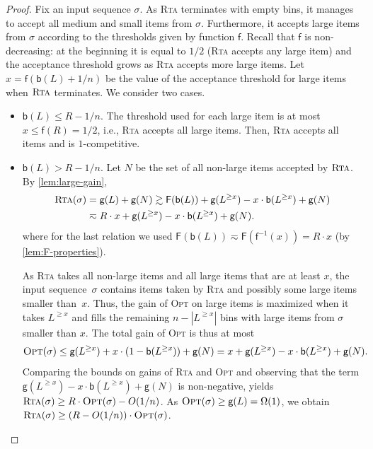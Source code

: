 \documentclass[a4paper,USenglish,cleveref]{lipics-v2019}
\newcommand{\R}{\ensuremath{R}}
\newcommand{\LG}{\ensuremath{L}\xspace}
\newcommand{\f}{\textsf{f}}
\newcommand{\fintegral}{\textsf{F}}
\newcommand{\B}{\textsf{b}}
\newcommand{\gain}{\textsf{g}}
\newcommand{\ALG}{\textsc{Rta}\xspace}
\newcommand{\OPT}{\textsc{Opt}\xspace}
\begin{document}
\begin{proof}
Fix an input sequence $\sigma$. As \ALG terminates with empty bins, it manages to 
accept all medium and small items from $\sigma$. Furthermore, it accepts large 
items from $\sigma$ according to the thresholds given by function $\f$.
Recall that $\f$ is non-decreasing: at the beginning it is equal to
$1/2$ (\ALG accepts any large item) and the acceptance threshold 
grows as \ALG accepts more large items. 
Let $x = \f(\B(\LG)+1/n)$ be the value of the acceptance
threshold for large items when $\ALG$ terminates.
We consider two cases. 

\begin{itemize}
\item $\B(\LG) \leq \R - 1/n$.
The threshold used for each large item is at most $x \leq \f(\R) = 1/2$, i.e.,
\ALG accepts all large items. Then, \ALG accepts all items and is
$1$-competitive.

\item $\B(\LG) > \R - 1/n$.
Let $N$ be the set of all non-large items accepted by $\ALG$. 
By \cref{lem:large-gain}, 
\begin{align*}
    \ALG(\sigma) 
    & = \gain(\LG) + \gain(N) 
    \gtrsim \fintegral(\B(\LG)) + \gain(\LG^{\geq x}) - x \cdot \B(\LG^{\geq x}) + \gain(N) \\
    & \eqsim R \cdot x + \gain(\LG^{\geq x}) - x \cdot \B(\LG^{\geq x}) + \gain(N).
\end{align*}  
where for the last relation we used $\fintegral(\B(\LG)) \eqsim \fintegral(\f^{-1}(x)) = \R \cdot x$ 
(by \cref{lem:F-properties}).

As \ALG takes all non-large items and all large items that are at least $x$, the
input sequence~$\sigma$ contains items taken by \ALG and possibly some large
items smaller than~$x$. Thus, the gain of \OPT on large items is maximized when
it takes $\LG^{\geq x}$ and fills the remaining $n - |L^{\geq x}|$ bins with
large items from $\sigma$ smaller than $x$. The total gain of \OPT
is thus at most 
\[
  \OPT(\sigma) \leq \gain(L^{\geq x}) + x \cdot (1-\B(\LG^{\geq x})) + \gain(N) 
  = x + \gain(L^{\geq x}) - x \cdot \B(\LG^{\geq x}) + \gain(N).
\]
Comparing the bounds on gains of \ALG and \OPT and observing that 
the term $\gain(L^{\geq x}) - x \cdot \B(\LG^{\geq x}) + \gain(N)$
is non-negative, yields $\ALG(\sigma) \geq \R \cdot \OPT(\sigma) - O(1/n)$. 
As $\OPT(\sigma) \geq \gain(\LG) = \Omega(1)$, we obtain
$\ALG(\sigma) \geq (\R - O(1/n)) \cdot \OPT(\sigma)$.
\qedhere
\end{itemize}
\end{proof}
\end{document}
